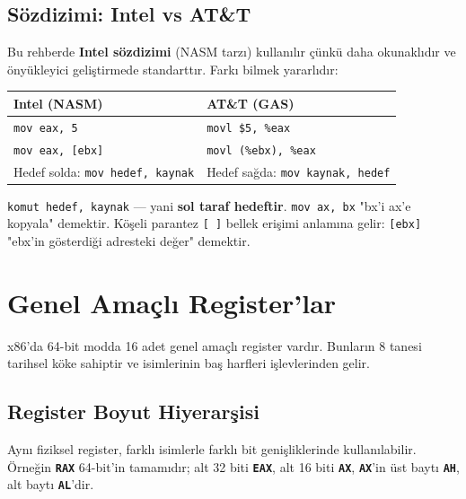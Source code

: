 \documentclass[11pt,a4paper]{article}
\newcommand{\reg}[1]{\texttt{\color{anaMavi}\textbf{#1}}}
\newcommand{\kod}[1]{\texttt{\color{koyuGri}#1}}
\begin{document}
\subsection{Sözdizimi: Intel vs AT\&T}

Bu rehberde \textbf{Intel sözdizimi} (NASM tarzı) kullanılır çünkü daha okunaklıdır
ve önyükleyici geliştirmede standarttır. Farkı bilmek yararlıdır:

\begin{center}
\begin{tabularx}{\textwidth}{@{}>{\raggedright\arraybackslash}X >{\raggedright\arraybackslash}X@{}}
\toprule
\rowcolor{acikMavi}\color{anaMavi}\textbf{Intel (NASM)} & \color{anaMavi}\textbf{AT\&T (GAS)} \\
\midrule
\kod{mov eax, 5} & \kod{movl \$5, \%eax} \\
\rowcolor{acikGri} \kod{mov eax, [ebx]} & \kod{movl (\%ebx), \%eax} \\
Hedef solda: \kod{mov hedef, kaynak} & Hedef sağda: \kod{mov kaynak, hedef} \\
\bottomrule
\end{tabularx}
\end{center}

\begin{notkutu}
\kod{komut hedef, kaynak} — yani \textbf{sol taraf hedeftir}. \kod{mov ax, bx}
"bx'i ax'e kopyala" demektir. Köşeli parantez \kod{[ ]} bellek erişimi anlamına
gelir: \kod{[ebx]} "ebx'in gösterdiği adresteki değer" demektir.
\end{notkutu}

\section{Genel Amaçlı Register'lar}

x86'da 64-bit modda 16 adet genel amaçlı register vardır. Bunların 8 tanesi
tarihsel köke sahiptir ve isimlerinin baş harfleri işlevlerinden gelir.

\subsection{Register Boyut Hiyerarşisi}

Aynı fiziksel register, farklı isimlerle farklı bit genişliklerinde
kullanılabilir. Örneğin \reg{RAX} 64-bit'in tamamıdır; alt 32 biti \reg{EAX},
alt 16 biti \reg{AX}, \reg{AX}'in üst baytı \reg{AH}, alt baytı \reg{AL}'dir.
\end{document}
